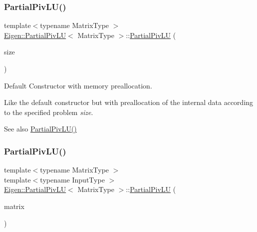 \subsubsection{\texorpdfstring{PartialPivLU()}{PartialPivLU()}\hspace{0.1cm}{\footnotesize\ttfamily [2/4]}}
{\footnotesize\ttfamily template$<$typename Matrix\+Type $>$ \\
\mbox{\hyperlink{class_eigen_1_1_partial_piv_l_u}{Eigen\+::\+Partial\+Piv\+LU}}$<$ Matrix\+Type $>$\+::\mbox{\hyperlink{class_eigen_1_1_partial_piv_l_u}{Partial\+Piv\+LU}} (\begin{DoxyParamCaption}\item[{\mbox{\hyperlink{struct_eigen_1_1_eigen_base_a554f30542cc2316add4b1ea0a492ff02}{Index}}}]{size }\end{DoxyParamCaption})\hspace{0.3cm}{\ttfamily [explicit]}}



Default Constructor with memory preallocation. 

Like the default constructor but with preallocation of the internal data according to the specified problem {\itshape size}. \begin{DoxySeeAlso}{See also}
\mbox{\hyperlink{class_eigen_1_1_partial_piv_l_u_a5c04818d354f94a98786d8a44cb709c6}{Partial\+Piv\+L\+U()}} 
\end{DoxySeeAlso}
\mbox{\label{class_eigen_1_1_partial_piv_l_u_acf37214aebb54d0e186ae39ac6c41bdf}} 
\subsubsection{\texorpdfstring{PartialPivLU()}{PartialPivLU()}\hspace{0.1cm}{\footnotesize\ttfamily [3/4]}}
{\footnotesize\ttfamily template$<$typename Matrix\+Type $>$ \\
template$<$typename Input\+Type $>$ \\
\mbox{\hyperlink{class_eigen_1_1_partial_piv_l_u}{Eigen\+::\+Partial\+Piv\+LU}}$<$ Matrix\+Type $>$\+::\mbox{\hyperlink{class_eigen_1_1_partial_piv_l_u}{Partial\+Piv\+LU}} (\begin{DoxyParamCaption}\item[{const \mbox{\hyperlink{struct_eigen_1_1_eigen_base}{Eigen\+Base}}$<$ Input\+Type $>$ \&}]{matrix }\end{DoxyParamCaption})\hspace{0.3cm}{\ttfamily [explicit]}}

